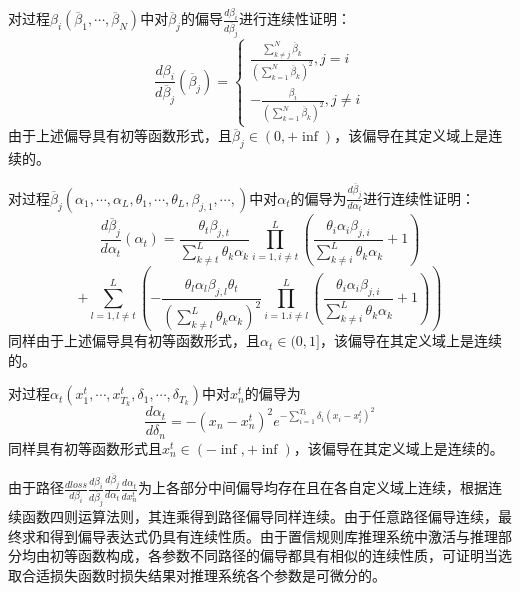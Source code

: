 \documentclass{cjc}
\begin{document}
对过程$\beta_i(\overline{\beta}_1,\cdots,\overline{\beta}_N)$中对$\overline{\beta}_j$的偏导$\frac{d\beta_i}{d\overline{\beta}_j}$进行连续性证明：
$$\frac{d\beta_i}{d\overline{\beta}_j}(\overline{\beta}_j)=
\left\{
\begin{aligned}
	\frac{\sum_{k\neq j}^N\overline{\beta}_k}{(\sum_{k=1}^N\overline{\beta}_k)^2},j=i\\
	-\frac{\beta_i}{(\sum_{k=1}^N\overline{\beta}_k)^2},j\neq i
\end{aligned}
\right.$$
由于上述偏导具有初等函数形式，且$\overline{\beta}_j\in(0,+\inf)$，该偏导在其定义域上是连续的。

对过程$\overline{\beta}_j(\alpha_1,\cdots,\alpha_L,\theta_1,\cdots,\theta_L,\beta_{j,1},\cdots,)$中对$\alpha_t$的偏导为$\frac{d\overline{\beta}_j}{d\alpha_t}$进行连续性证明：
$$\frac{d\overline{\beta}_j}{d\alpha_t}(\alpha_t)=\frac{\theta_t\beta_{j,t}}{\sum_{k\neq t}^L\theta_k\alpha_k}\prod_{i=1,i\neq t}^L(\frac{\theta_i\alpha_i\beta_{j,i}}{\sum_{k\neq i}^L{\theta_k\alpha_k}}+1)$$
$$+\sum_{l=1,l\neq t}^L(-\frac{\theta_l\alpha_l\beta_{j,l}\theta_t}{(\sum_{k\neq l}^L\theta_k\alpha_k)^2}\prod_{i=1.i\neq l}^L(\frac{\theta_i\alpha_i\beta_{j,i}}{\sum_{k\neq i}^L{\theta_k\alpha_k}}+1))$$
同样由于上述偏导具有初等函数形式，且$\alpha_t\in(0,1]$，该偏导在其定义域上是连续的。

对过程$\alpha_t(x_1^t,\cdots,x_{T_k}^t,\delta_1,\cdots,\delta_{T_k})$中对$x_n^t$的偏导为$$\frac{d\alpha_t}{d\delta_n}=-(x_n-x_n^t)^{2}e^{-\sum_{i=1}^{T_k}\delta_i(x_i-x_i^t)^2}$$
同样具有初等函数形式且$x_n^t\in(-\inf,+\inf)$，该偏导在其定义域上是连续的。

由于路径$\frac{dloss}{d\beta_i}\frac{d\beta_i}{d\overline{\beta}_j}\frac{d\overline{\beta}_j}{d\alpha_t}\frac{d\alpha_t}{dx_n^t}$为上各部分中间偏导均存在且在各自定义域上连续，根据连续函数四则运算法则，其连乘得到路径偏导同样连续。由于任意路径偏导连续，最终求和得到偏导表达式仍具有连续性质。由于置信规则库推理系统中激活与推理部分均由初等函数构成，各参数不同路径的偏导都具有相似的连续性质，可证明当选取合适损失函数时损失结果对推理系统各个参数是可微分的。


\makebiographies
\end{document}
